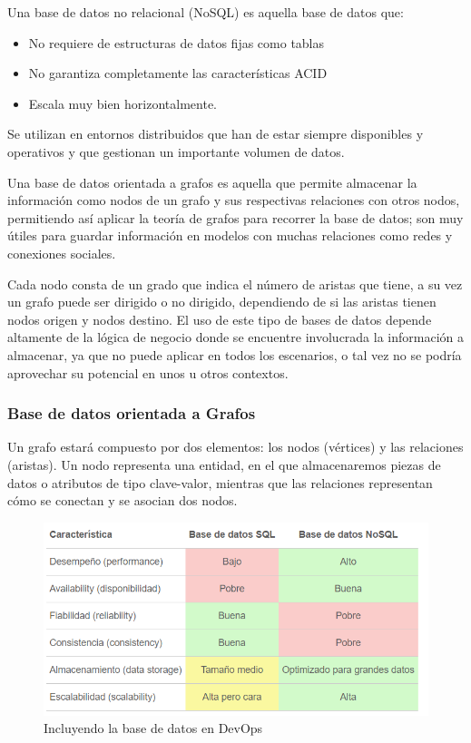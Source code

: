 \documentclass[preprint,12pt]{elsarticle}
\begin{document}
Una base de datos no relacional (NoSQL) es aquella base de datos que:

\begin{itemize}
	\item No requiere de estructuras de datos fijas como tablas
	\item No garantiza completamente las características ACID
	\item Escala muy bien horizontalmente.
\end{itemize}

Se utilizan en entornos distribuidos que han de estar siempre disponibles y operativos y que gestionan un importante volumen de datos.

Una base de datos orientada a grafos es aquella que permite almacenar la información como nodos de un grafo y sus respectivas relaciones con otros nodos, permitiendo así aplicar la teoría de grafos para recorrer la base de datos; son muy útiles para guardar información en modelos con muchas relaciones como redes y conexiones sociales. 

Cada nodo consta de un grado que indica el número de aristas que tiene, a su vez un grafo puede ser dirigido o no dirigido, dependiendo de
si las aristas tienen nodos origen y nodos destino. El uso de este tipo de bases de datos depende altamente de la lógica de negocio donde se encuentre involucrada la información a almacenar, ya que no puede aplicar en todos los escenarios, o tal vez no se podría aprovechar su potencial en
unos u otros contextos. 


\subsubsection{\textbf{Base de datos orientada a Grafos}}

Un grafo estará compuesto por dos elementos: los nodos (vértices) y las relaciones (aristas). Un nodo representa una entidad, en el que almacenaremos piezas de datos o atributos de tipo clave-valor, mientras que las relaciones representan cómo se conectan y se asocian dos nodos.\\

\begin{figure}[htb]
	\begin{center}
		\includegraphics[width=14cm]{./IMAGENES/basededatos_3} 
		\caption{Incluyendo la base de datos en DevOps}
	\end{center}
\end{figure}
\end{document}
